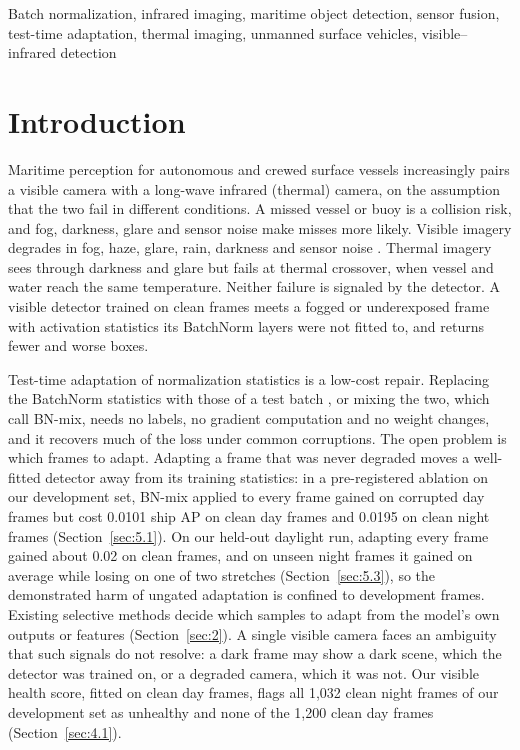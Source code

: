 \documentclass[journal]{IEEEtran}
\begin{document}
\begin{IEEEkeywords}
Batch normalization, infrared imaging, maritime object detection, sensor fusion, test-time adaptation, thermal imaging, unmanned surface vehicles, visible--infrared detection
\end{IEEEkeywords}

\section{Introduction}\label{sec:1}
Maritime perception for autonomous and crewed surface vessels increasingly pairs a visible camera with a long-wave infrared (thermal) camera, on the assumption that the two fail in different conditions. A missed vessel or buoy is a collision risk, and fog, darkness, glare and sensor noise make misses more likely. Visible imagery degrades in fog, haze, glare, rain, darkness and sensor noise \cite{prasad2017video}. Thermal imagery sees through darkness and glare but fails at thermal crossover, when vessel and water reach the same temperature. Neither failure is signaled by the detector. A visible detector trained on clean frames meets a fogged or underexposed frame with activation statistics its BatchNorm layers were not fitted to, and returns fewer and worse boxes.

Test-time adaptation of normalization statistics is a low-cost repair. Replacing the BatchNorm statistics with those of a test batch \cite{li2017revisiting}, or mixing the two, which \citet{schneider2020improving} call BN-mix, needs no labels, no gradient computation and no weight changes, and it recovers much of the loss under common corruptions. The open problem is which frames to adapt. Adapting a frame that was never degraded moves a well-fitted detector away from its training statistics: in a pre-registered ablation on our development set, BN-mix applied to every frame gained on corrupted day frames but cost 0.0101 ship AP on clean day frames and 0.0195 on clean night frames (Section~\ref{sec:5.1}). On our held-out daylight run, adapting every frame gained about 0.02 on clean frames, and on unseen night frames it gained on average while losing on one of two stretches (Section~\ref{sec:5.3}), so the demonstrated harm of ungated adaptation is confined to development frames. Existing selective methods decide which samples to adapt from the model's own outputs or features (Section~\ref{sec:2}). A single visible camera faces an ambiguity that such signals do not resolve: a dark frame may show a dark scene, which the detector was trained on, or a degraded camera, which it was not. Our visible health score, fitted on clean day frames, flags all 1,032 clean night frames of our development set as unhealthy and none of the 1,200 clean day frames (Section~\ref{sec:4.1}).
\end{document}
